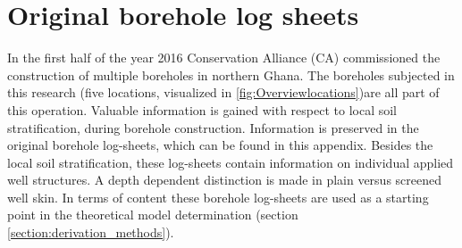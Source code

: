 \chapter{Original borehole log sheets}
\label{chapter:Borehole_logsheets}

In the first half of the year 2016 Conservation Alliance (CA) commissioned the construction of multiple boreholes in northern Ghana. The boreholes subjected in this research (five locations, visualized in \ref{fig:Overviewlocations})are all part of this operation. Valuable information is gained with respect to local soil stratification, during borehole construction. Information is preserved in the original borehole log-sheets, which can be found in this appendix. Besides the local soil stratification, these log-sheets contain information on individual applied well structures. A depth dependent distinction is made in plain versus screened well skin. In terms of content these borehole log-sheets are used as a starting point in the theoretical model determination (section \ref{section:derivation_methods}). 





